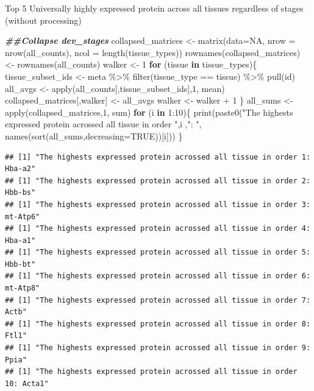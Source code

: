 \documentclass[
]{article}
\newenvironment{Shaded}{\begin{snugshade}}{\end{snugshade}}
\newcommand{\AttributeTok}[1]{\textcolor[rgb]{0.77,0.63,0.00}{#1}}
\newcommand{\ConstantTok}[1]{\textcolor[rgb]{0.00,0.00,0.00}{#1}}
\newcommand{\ControlFlowTok}[1]{\textcolor[rgb]{0.13,0.29,0.53}{\textbf{#1}}}
\newcommand{\DecValTok}[1]{\textcolor[rgb]{0.00,0.00,0.81}{#1}}
\newcommand{\DocumentationTok}[1]{\textcolor[rgb]{0.56,0.35,0.01}{\textbf{\textit{#1}}}}
\newcommand{\FunctionTok}[1]{\textcolor[rgb]{0.00,0.00,0.00}{#1}}
\newcommand{\NormalTok}[1]{#1}
\newcommand{\OtherTok}[1]{\textcolor[rgb]{0.56,0.35,0.01}{#1}}
\newcommand{\SpecialCharTok}[1]{\textcolor[rgb]{0.00,0.00,0.00}{#1}}
\newcommand{\StringTok}[1]{\textcolor[rgb]{0.31,0.60,0.02}{#1}}
\begin{document}
Top 5 Universally highly expressed protein across all tissues regardless
of stages (without processing)

\begin{Shaded}
\begin{Highlighting}[]
\DocumentationTok{\#\#Collapse dev\_stages}
\NormalTok{collapsed\_matrices }\OtherTok{\textless{}{-}} \FunctionTok{matrix}\NormalTok{(}\AttributeTok{data=}\ConstantTok{NA}\NormalTok{, }\AttributeTok{nrow =} \FunctionTok{nrow}\NormalTok{(all\_counts), }\AttributeTok{ncol =} \FunctionTok{length}\NormalTok{(tissue\_types))}
\FunctionTok{rownames}\NormalTok{(collapsed\_matrices) }\OtherTok{\textless{}{-}} \FunctionTok{rownames}\NormalTok{(all\_counts)}
\NormalTok{walker }\OtherTok{\textless{}{-}} \DecValTok{1}
\ControlFlowTok{for}\NormalTok{ (tissue }\ControlFlowTok{in}\NormalTok{ tissue\_types)\{}
\NormalTok{  tissue\_subset\_ids }\OtherTok{\textless{}{-}}\NormalTok{ meta }\SpecialCharTok{\%\textgreater{}\%} \FunctionTok{filter}\NormalTok{(tissue\_type }\SpecialCharTok{==}\NormalTok{ tissue) }\SpecialCharTok{\%\textgreater{}\%} \FunctionTok{pull}\NormalTok{(id)}
\NormalTok{  all\_avgs }\OtherTok{\textless{}{-}} \FunctionTok{apply}\NormalTok{(all\_counts[,tissue\_subset\_ids],}\DecValTok{1}\NormalTok{, mean)}
\NormalTok{  collapsed\_matrices[,walker] }\OtherTok{\textless{}{-}}\NormalTok{ all\_avgs}
\NormalTok{  walker }\OtherTok{\textless{}{-}}\NormalTok{ walker }\SpecialCharTok{+} \DecValTok{1}
\NormalTok{\}}
\NormalTok{all\_sums }\OtherTok{\textless{}{-}} \FunctionTok{apply}\NormalTok{(collapsed\_matrices,}\DecValTok{1}\NormalTok{, sum)}
\ControlFlowTok{for}\NormalTok{ (i }\ControlFlowTok{in} \DecValTok{1}\SpecialCharTok{:}\DecValTok{10}\NormalTok{)\{}
  \FunctionTok{print}\NormalTok{(}\FunctionTok{paste0}\NormalTok{(}\StringTok{"The highests expressed protein acrossed all tissue in order "}\NormalTok{,i ,}\StringTok{": "}\NormalTok{, }\FunctionTok{names}\NormalTok{(}\FunctionTok{sort}\NormalTok{(all\_sums,}\AttributeTok{decreasing=}\ConstantTok{TRUE}\NormalTok{))[i]))}
\NormalTok{\}}
\end{Highlighting}
\end{Shaded}

\begin{verbatim}
## [1] "The highests expressed protein acrossed all tissue in order 1: Hba-a2"
## [1] "The highests expressed protein acrossed all tissue in order 2: Hbb-bs"
## [1] "The highests expressed protein acrossed all tissue in order 3: mt-Atp6"
## [1] "The highests expressed protein acrossed all tissue in order 4: Hba-a1"
## [1] "The highests expressed protein acrossed all tissue in order 5: Hbb-bt"
## [1] "The highests expressed protein acrossed all tissue in order 6: mt-Atp8"
## [1] "The highests expressed protein acrossed all tissue in order 7: Actb"
## [1] "The highests expressed protein acrossed all tissue in order 8: Ftl1"
## [1] "The highests expressed protein acrossed all tissue in order 9: Ppia"
## [1] "The highests expressed protein acrossed all tissue in order 10: Acta1"
\end{verbatim}
\end{document}
